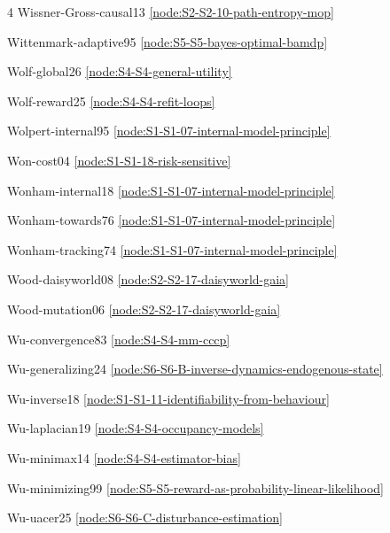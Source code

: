 \documentclass[10pt]{article}
\begin{document}
{\begin{multicols}{4}
Wissner-Gross-causal13 \hfill \ref{node:S2-S2-10-path-entropy-mop}\par
Wittenmark-adaptive95 \hfill \ref{node:S5-S5-bayes-optimal-bamdp}\par
Wolf-global26 \hfill \ref{node:S4-S4-general-utility}\par
Wolf-reward25 \hfill \ref{node:S4-S4-refit-loops}\par
Wolpert-internal95 \hfill \ref{node:S1-S1-07-internal-model-principle}\par
Won-cost04 \hfill \ref{node:S1-S1-18-risk-sensitive}\par
Wonham-internal18 \hfill \ref{node:S1-S1-07-internal-model-principle}\par
Wonham-towards76 \hfill \ref{node:S1-S1-07-internal-model-principle}\par
Wonham-tracking74 \hfill \ref{node:S1-S1-07-internal-model-principle}\par
Wood-daisyworld08 \hfill \ref{node:S2-S2-17-daisyworld-gaia}\par
Wood-mutation06 \hfill \ref{node:S2-S2-17-daisyworld-gaia}\par
Wu-convergence83 \hfill \ref{node:S4-S4-mm-cccp}\par
Wu-generalizing24 \hfill \ref{node:S6-S6-B-inverse-dynamics-endogenous-state}\par
Wu-inverse18 \hfill \ref{node:S1-S1-11-identifiability-from-behaviour}\par
Wu-laplacian19 \hfill \ref{node:S4-S4-occupancy-models}\par
Wu-minimax14 \hfill \ref{node:S4-S4-estimator-bias}\par
Wu-minimizing99 \hfill \ref{node:S5-S5-reward-as-probability-linear-likelihood}\par
Wu-uacer25 \hfill \ref{node:S6-S6-C-disturbance-estimation}\par


\end{multicols}}
\end{document}
